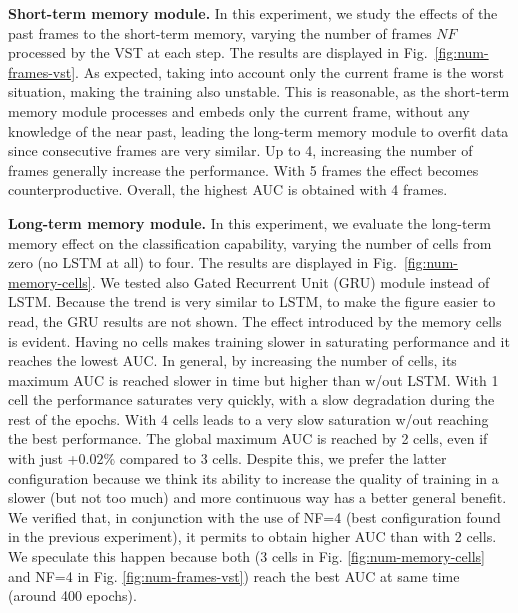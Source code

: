 \noindent\textbf{Short-term memory module.}
In this experiment, we study the effects of the past frames to the short-term memory, varying the number of frames $\mathit{NF}$ processed by the VST at each step.
The results are displayed in Fig.~\ref{fig:num-frames-vst}.
As expected, taking into account only the current frame is the worst situation, making the training also unstable.
This is reasonable, as the short-term memory module processes and embeds only the current frame, without any knowledge of the near past, leading the long-term memory module to overfit data since consecutive frames are very similar.
Up to 4, increasing the number of frames generally increase the performance.
With 5 frames the effect becomes counterproductive.
Overall, the highest AUC is obtained with 4 frames.

\noindent\textbf{Long-term memory module.}
In this experiment, we evaluate the long-term memory effect on the classification capability, varying the number of cells from zero (no LSTM at all) to four.
The results are displayed in Fig.~\ref{fig:num-memory-cells}.
We tested also Gated Recurrent Unit (GRU) module instead of LSTM.
Because the trend is very similar to LSTM, to make the figure easier to read, the GRU results are not shown.
The effect introduced by the memory cells is evident.
Having no cells makes training slower in saturating performance and it reaches the lowest AUC.
In general, by increasing the number of cells, its maximum AUC is reached slower in time but higher than w/out LSTM.
With 1 cell the performance saturates very quickly, with a slow degradation during the rest of the epochs.
With 4 cells leads to a very slow saturation w/out reaching the best performance.
The global maximum AUC is reached by 2 cells, even if with just +$0.02\%$ compared to 3 cells.
Despite this, we prefer the latter configuration because we think its ability to increase the quality of training in a slower (but not too much) and more continuous way has a better general benefit.
We verified that, in conjunction with the use of NF=4 (best configuration found in the previous experiment), it permits to obtain higher AUC than with 2 cells.
We speculate this happen because both (3 cells in Fig. \ref{fig:num-memory-cells} and NF=4 in Fig. \ref{fig:num-frames-vst}) reach the best AUC at same time (around 400 epochs).

